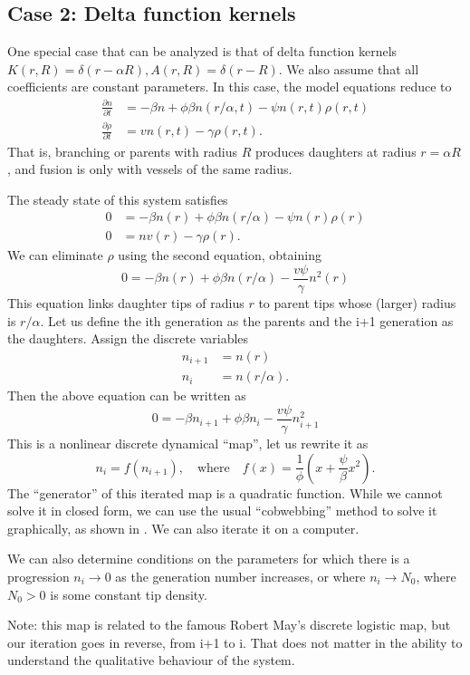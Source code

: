 \subsection{Case 2: Delta function kernels}

One special case that can be analyzed is that of delta function kernels $K(r,R)=\delta(r-\alpha R), A(r, R) = \delta(r-R)$. 
We also assume that all coefficients are constant parameters.
In this case, the model equations reduce to
\begin{align}
	\frac{\partial n}{\partial t} &= -\beta n + \phi \beta n(r/\alpha,t)  - \psi n(r,t) \rho(r,t)\\
	\frac{\partial \rho}{\partial t} &= v n(r,t) - \gamma \rho(r,t)  .
\end{align}
That is, branching or parents with radius $R$ produces daughters at radius $r=\alpha R$, and fusion is only with vessels of the same radius.

The steady state of this system satisfies
\begin{align}
	0 &= -\beta n(r) + \phi \beta n(r/\alpha)  - \psi n(r) \rho(r)\\
	0 &= nv(r) - \gamma \rho(r)  .
\end{align}
We can eliminate $\rho$ using the second equation, obtaining
\begin{equation}
	\label{eq:discreteEq1}
	0= -\beta n(r) + \phi \beta n(r/\alpha)  - \frac{v\psi}{\gamma} n^2(r)
\end{equation}
This equation links daughter tips of radius $r$ to parent tips whose (larger) radius is $r/\alpha$. Let us define the ith generation as the parents and the i+1 generation as the daughters. Assign the discrete variables
\begin{align}
	n_{i+1}&= n(r)\\
	n_i&=n(r/\alpha).
\end{align}
Then the above equation can be written as
\begin{equation}
	\label{eq:discreteEq2}
	0= -\beta n_{i+1} + \phi \beta n_i - \frac{v\psi}{\gamma} n^2_{i+1}
\end{equation}
This is a nonlinear discrete dynamical ``map'', let us rewrite it as
\[
n_i=f(n_{i+1}), \quad \text{where} \quad f(x)=\frac{1}{\phi}\left(x+\frac{\psi}{\beta}x^2\right).
\]
The ``generator'' of this iterated map is a quadratic function.  While we cannot solve it in closed form, we can use the usual ``cobwebbing'' method to solve it graphically, as shown in \cite{edelstein2005mathematical}. We can also iterate it on a computer. 

We can also determine conditions on the parameters for which there is a progression $n_i \to 0$ as the generation number increases, or where $n_i \to N_0$, where $N_0>0$ is some constant tip density.

Note: this map is related to the famous Robert May's discrete logistic map, but our iteration goes in reverse, from i+1 to i. That does not matter in the ability to understand the qualitative behaviour of the system.


